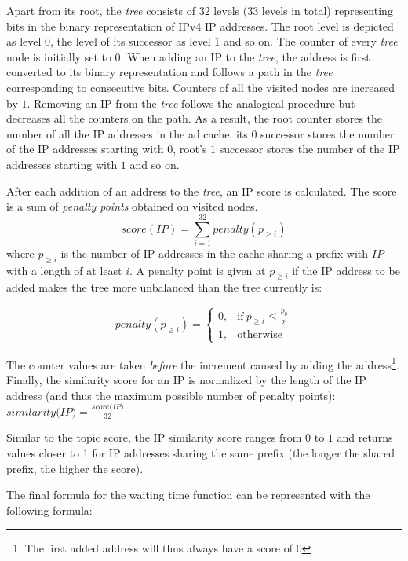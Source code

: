 Apart from its root, the \emph{tree} consists of 32 levels (33 levels in total) representing bits in the binary representation of IPv4 IP addresses. 
The root level is depicted as level $0$, the level of its successor as level $1$ and so on. 
The counter of every \emph{tree} node is initially set to $0$. When adding an IP to the \emph{tree}, the address is first converted to its binary representation and follows a path in the \emph{tree} corresponding to consecutive bits. 
Counters of all the visited nodes are increased by $1$. Removing an IP from the \emph{tree} follows the analogical procedure but decreases all the counters on the path. 
As a result, the root counter stores the number of all the IP addresses in the ad cache, its $0$ successor stores the number of the IP addresses starting with $0$, root's $1$ successor stores the number of the IP addresses starting with $1$ and so on. 

After each addition of an address to the \emph{tree}, an IP score is calculated.
The score is a sum of \emph{penalty points} obtained on visited nodes. 
$$score(IP)=\sum_{i=1}^{32} \textit{penalty}(p_{\geq i}) $$
where $p_{\geq i}$ is the number of IP addresses in the cache sharing a prefix with $IP$ with a length of at least $i$. A penalty point is given at $p_{\geq i}$ if the IP address to be added makes the tree more unbalanced than the tree currently is:

\begin{equation}
    \textit{penalty}(p_{\geq i})=
    \begin{cases}
      0, & \text{if}\ p_{\geq i} \leq \frac{p_0}{2^i} \\
      1, & \text{otherwise}
    \end{cases}
  \end{equation}

The counter values are taken \emph{before} the increment caused by adding the address\footnote{The first added address will thus always have a score of $0$}. 
Finally, the similarity score for an IP is normalized by the length of the IP address (and thus the maximum possible number of penalty points): $\textit{similarity(IP}) = \frac{\textit{score(IP)}}{32}$

Similar to the topic score, the IP similarity score ranges from $0$ to $1$ and returns values closer to 1 for IP addresses sharing the same prefix (the longer the shared prefix, the higher the score).

The final formula for the waiting time function can be represented with the following formula:%

